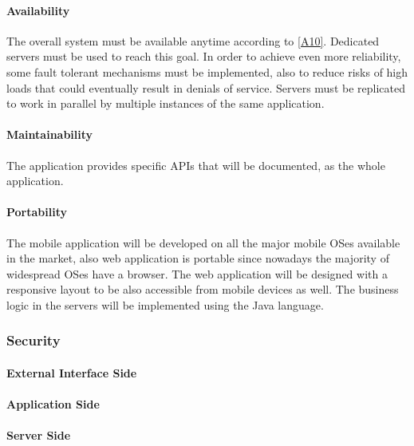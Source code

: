 \documentclass[a4paper,12pt]{article}%
\begin{document}
\paragraph{Availability} The overall system must be available anytime according to \hyperref[a10]{[A10]}. Dedicated servers must be used to reach this goal. In order to achieve even more reliability, some fault tolerant mechanisms must be implemented, also to reduce risks of high loads that could eventually result in denials of service. Servers must be replicated to work in parallel by multiple instances of the same application. 
\paragraph{Maintainability} The application provides specific APIs that will be documented, as the whole application.
\paragraph{Portability} The mobile application will be developed on all the major mobile OSes available in the market, also web application is portable since nowadays the majority of widespread OSes have a browser. The web application will be designed with a responsive layout to be also accessible from mobile devices as well. The business logic in the servers will be implemented using the Java language.
\subsubsection{Security}
\paragraph{External Interface Side}
\paragraph{Application Side}
\paragraph{Server Side}
\end{document}
